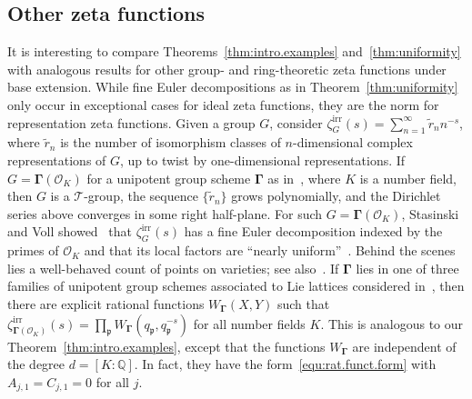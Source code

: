 \documentclass[11pt,a4paper]{amsart}
\theoremstyle{plain}
\theoremstyle{remark}
\newcommand{\Q}{\mathbb{Q}}
\newcommand{\p}{\mathfrak{p}}
\def \p {\ensuremath{\mathfrak{p}}}
\begin{document}
\subsection{Other zeta functions} \label{sec:siblings}
It is interesting to compare Theorems~\ref{thm:intro.examples} and~\ref{thm:uniformity} with analogous results 
for other group- and ring-theoretic zeta functions under base extension.  While fine Euler decompositions as in Theorem~\ref{thm:uniformity} only occur in exceptional cases for ideal zeta functions, they are the norm for representation zeta functions.  Given a group $G$, consider $\zeta^\mathrm{irr}_{G}(s) = \sum_{n = 1}^\infty \widetilde{r}_n n^{-s}$, where $\widetilde{r}_n$ is the number of isomorphism classes of $n$-dimensional complex representations of $G$, up to twist by one-dimensional representations.  If $G = \boldsymbol{\Gamma}(\mathcal{O}_K)$ for a unipotent group scheme $\boldsymbol{\Gamma}$ as in~\cite[\S2.1]{StasinskiVoll/14}, where $K$ is a number field, then $G$ is a $\mathcal{T}$-group, the sequence $\{ \widetilde{r}_n \}$ grows polynomially, and the Dirichlet series above converges in some right half-plane.  For such $G = \boldsymbol{\Gamma}(\mathcal{O}_K)$, Stasinski and Voll showed~\cite[Proposition~2.2]{StasinskiVoll/14} that $\zeta^\mathrm{irr}_{G}(s)$ has a fine Euler decomposition indexed by the primes of $\mathcal{O}_K$ and that its local factors are ``nearly uniform''~\cite[Theorem~A]{StasinskiVoll/14}.  Behind the scenes lies a well-behaved count of points on varieties; see also~\cite[Theorem~8.13]{HMR/18}.  If $\boldsymbol{\Gamma}$ lies in one of three families of unipotent group schemes associated to Lie lattices considered in~\cite[Theorem~B]{StasinskiVoll/14}, then there are explicit rational functions $W_{\boldsymbol{\Gamma}}(X,Y)$ such that
$ \zeta^{\mathrm{irr}}_{\boldsymbol{\Gamma}(\mathcal{O}_K)}(s) = \prod_{\p} W_{\boldsymbol{\Gamma}}(q_\p, q_\p^{-s})$
for all number fields $K$.  This is analogous to our Theorem~\ref{thm:intro.examples}, except that the functions $W_{\boldsymbol{\Gamma}}$ are independent of the degree $d = [K:\Q]$.  In fact, they have the form~\eqref{equ:rat.funct.form} with $A_{j,1} = C_{j,1} = 0$ for all $j$.
\end{document}
